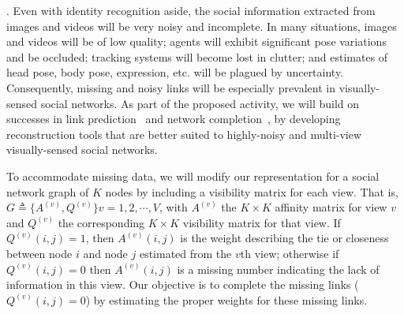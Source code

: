 
\label{sec:reconstruct}

. Even with identity recognition aside, the social information extracted from images and videos will be very noisy and incomplete. In many situations, images and videos will be of low quality; agents will exhibit significant pose variations and be occluded; tracking systems will become lost in clutter; and estimates of head pose, body pose, expression, etc. will be plagued by uncertainty. Consequently, missing and noisy links will be especially prevalent in visually-sensed social networks. As part of the proposed activity, we will build on successes in link prediction~\cite{Goldberg,Liben-Nowell,TaskarWAK03} and network completion~\cite{Clauset,Guimera,HannekeX09,KimL11}, by developing reconstruction tools that are better suited to highly-noisy and multi-view visually-sensed social networks.

To accommodate missing data, we will modify our representation for a social network graph of $K$ nodes by including a visibility matrix for each view. That is, $G\triangleq\{A^{(v)}, Q^{(v)}\} v=1,2,\cdots,V$, with $A^{(v)}$  the $K\times K$ affinity matrix for view $v$ and $Q^{(v)}$  the corresponding $K\times K$ visibility matrix for that view. If $Q^{(v)}(i,j)=1$, then $A^{(v)}(i,j)$ is the weight describing the tie or closeness between node $i$ and node $j$ estimated from the $v$th view; otherwise if $Q^{(v)}(i,j)=0$ then $A^{(v)}(i,j)$ is a missing number indicating the lack of information in this view. Our objective is to complete the missing links ($Q^{(v)}(i,j)=0$) by estimating the proper weights for these missing links.

